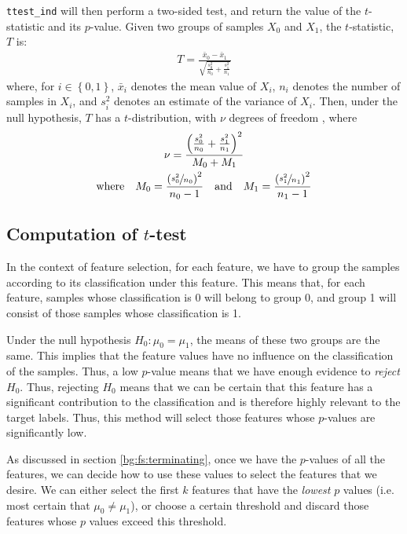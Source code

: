 \documentclass[12pt, twoside, a4paper]{report}
\begin{document}
\texttt{ttest\_ind} will then perform a two-sided test, and return the value of the $t$-statistic and its $p$-value. Given two groups of samples $X_0$ and $X_1$, the $t$-statistic, $T$ is:
\begin{align*}
T = \frac{\bar{x}_0 - \bar{x}_1}{\sqrt{\frac{s_0^2}{n_0} + \frac{s_1^2}{n_1}}}
\end{align*}
where, for $i \in \left\lbrace 0,1 \right\rbrace$, $\bar{x}_i$ denotes the mean value of $X_i$, $n_i$ denotes the number of samples in $X_i$, and $s_i^2$ denotes an estimate of the variance of $X_i$. Then, under the null hypothesis, $T$ has a $t$-distribution, with $\nu$ degrees of freedom \cite{RefWorks:219}, where
\begin{gather*}
\nu = \frac{\left( \frac{s_0^2}{n_0} + \frac{s_1^2}{n_1} \right)^2}{ M_0 + M_1 } \\
\text{where} \quad M_0 = \frac{\left(\sfrac{s_0^2}{n_0}\right)^2}{n_0-1} \quad \text{and} \quad
M_1 = \frac{\left(\sfrac{s_1^2}{n_1}\right)^2}{n_1-1}
\end{gather*}

\subsection{Computation of $t$-test}
In the context of feature selection, for each feature, we have to group the samples according to its classification under this feature. This means that, for each feature, samples whose classification is 0 will belong to group 0, and group 1 will consist of those samples whose classification is 1.

Under the null hypothesis $H_0: \mu_0 = \mu_1$, the means of these two groups are the same. This implies that the feature values have no influence on the classification of the samples. Thus, a low $p$-value means that we have enough evidence to \textit{reject} $H_0$. Thus, rejecting $H_0$ means that we can be certain that this feature has a significant contribution to the classification and is therefore highly relevant to the target labels. Thus, this method will select those features whose $p$-values are significantly low.

As discussed in section \ref{bg:fs:terminating}, once we have the $p$-values of all the features, we can decide how to use these values to select the features that we desire. We can either select the first $k$ features that have the \textit{lowest} $p$ values (i.e. most certain that $\mu_0 \neq \mu_1$), or choose a certain threshold and discard those features whose $p$ values exceed this threshold.
\end{document}
